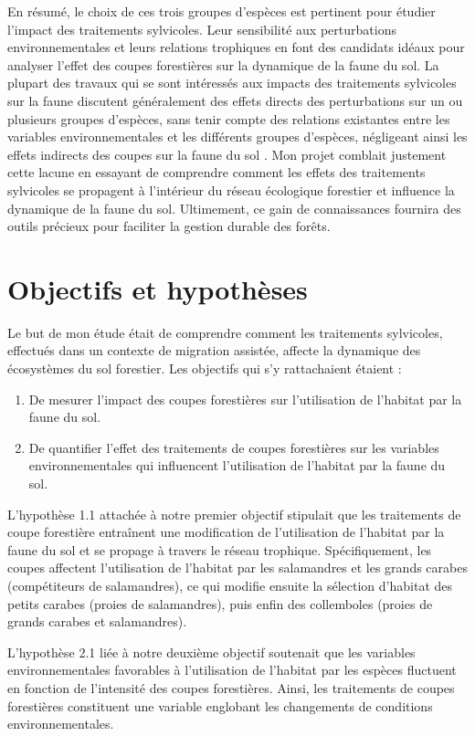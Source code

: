 En résumé, le choix de ces trois groupes d'espèces est pertinent pour étudier l'impact des traitements sylvicoles. 
Leur sensibilité aux perturbations environnementales et leurs relations trophiques en font des candidats idéaux pour analyser l'effet des coupes forestières sur la dynamique de la faune du sol.
La plupart des travaux qui se sont intéressés aux impacts des traitements sylvicoles sur la faune discutent généralement des effets directs des perturbations sur un ou plusieurs groupes d'espèces, 
sans tenir compte des relations existantes entre les variables environnementales et les différents groupes d'espèces, 
négligeant ainsi les effets indirects des coupes sur la faune du sol \citep{josephIntegratingOccupancyModels2016,Pollierer2021Diversityfunctional,Kudrin2023metaanalysiseffects}. 
Mon projet comblait justement cette lacune en essayant de comprendre comment les effets des traitements sylvicoles se propagent à l’intérieur du réseau écologique forestier et influence la dynamique de la faune du sol.  
Ultimement, ce gain de connaissances fournira des outils précieux pour faciliter la gestion durable des forêts.


\section*{Objectifs et hypothèses}
\label{sec:objectifs}

Le but de mon étude était de comprendre comment les traitements sylvicoles, effectués dans un contexte de migration assistée, 
affecte la dynamique des écosystèmes du sol forestier. Les objectifs qui s’y rattachaient étaient :

\begin{enumerate}
    \item De mesurer l'impact des coupes forestières sur l'utilisation de l'habitat par la faune du sol.
    \item De quantifier l'effet des traitements de coupes forestières sur les variables environnementales qui influencent l'utilisation de l'habitat par la faune du sol. 
\end{enumerate}

L'hypothèse 1.1 attachée à notre premier objectif stipulait que les traitements de coupe forestière entraînent une modification de l'utilisation de l'habitat 
par la faune du sol et se propage à travers le réseau trophique. Spécifiquement, les coupes affectent l'utilisation de l'habitat par les salamandres et 
les grands carabes (compétiteurs de salamandres), ce qui modifie ensuite la sélection d'habitat des petits carabes (proies de salamandres), puis enfin des collemboles (proies de grands carabes et salamandres).

L'hypothèse 2.1 liée à notre deuxième objectif soutenait que les variables environnementales favorables à l'utilisation de l'habitat par les espèces fluctuent 
en fonction de l'intensité des coupes forestières. Ainsi, les traitements de coupes forestières constituent une variable englobant 
les changements de conditions environnementales.

\cleardoublepage



